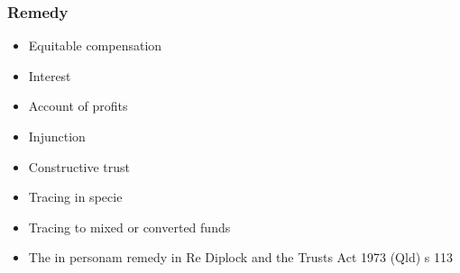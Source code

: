 \subsubsection*{Remedy}
\begin{itemize}
    \item Equitable compensation
    \item Interest
    \item Account of profits
    \item Injunction
    \item Constructive trust
    \item Tracing in specie
    \item Tracing to mixed or converted funds
    \item The in personam remedy in Re Diplock and the Trusts Act 1973 (Qld) s 113
\end{itemize}




